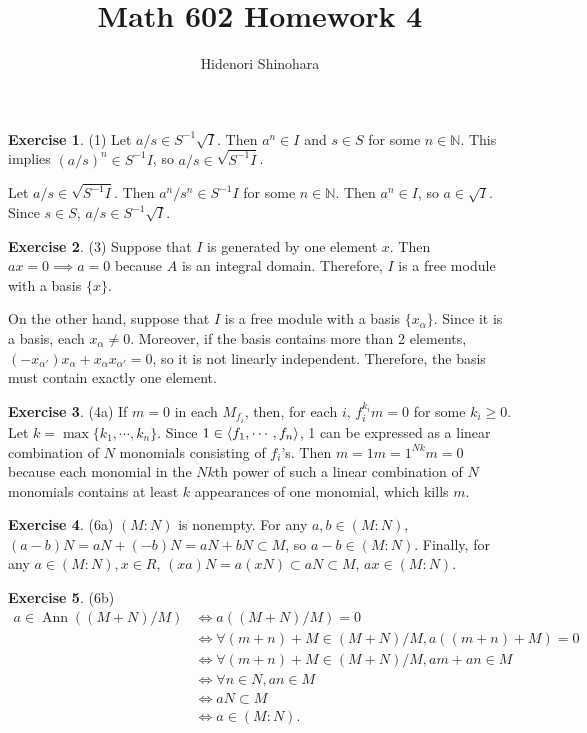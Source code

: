 \documentclass[12pt, psamsfonts]{amsart}
\theoremstyle{definition}
\newtheorem*{exer}{Exercise}
\theoremstyle{remark}
\DeclareMathOperator{\Ann}{Ann}
\numberwithin{equation}{section}
\begin{document}
\title{Math 602 Homework 4}
\author{Hidenori Shinohara}
\maketitle

\begin{exer}{(1)}
  Let $a / s \in S^{-1}\sqrt{I}$.
  Then $a^n \in I$ and $s \in S$ for some $n \in \mathbb{N}$.
  This implies $(a / s)^n \in S^{-1}I$, so $a / s \in \sqrt{S^{-1}I}$.

  Let $a / s \in \sqrt{S^{-1}I}$.
  Then $a^n / s^n \in S^{-1}I$ for some $n \in \mathbb{N}$.
  Then $a^n \in I$, so $a \in \sqrt{I}$.
  Since $s \in S$, $a / s \in S^{-1}\sqrt{I}$.
\end{exer}

\begin{exer}{(3)}
  Suppose that $I$ is generated by one element $x$.
  Then $ax = 0 \implies a = 0$ because $A$ is an integral domain.
  Therefore, $I$ is a free module with a basis $\{ x \}$.
  
  On the other hand, suppose that $I$ is a free module with a basis $\{ x_{\alpha} \}$.
  Since it is a basis, each $x_{\alpha} \ne 0$.
  Moreover, if the basis contains more than 2 elements, $(-x_{\alpha'})x_{\alpha} + x_{\alpha}x_{\alpha'} = 0$, so it is not linearly independent.
  Therefore, the basis must contain exactly one element.
\end{exer}

\begin{exer}{(4a)}
  If $m = 0$ in each $M_{f_i}$, then, for each $i$, $f_i^{k_i}m = 0$ for some $k_i \geq 0$.
  Let $k = \max\{ k_1, \cdots, k_n \}$.
  Since $1 \in \ev{f_1, \cdots, f_n}$, 1 can be expressed as a linear combination of $N$ monomials consisting of $f_i$'s.
  Then $m = 1m = 1^{Nk}m = 0$ because each monomial in the $Nk$th power of such a linear combination of $N$ monomials contains at least $k$ appearances of one monomial, which kills $m$.
\end{exer}

\begin{exer}{(6a)}
  $(M:N)$ is nonempty.
  For any $a, b \in (M:N)$, $(a - b)N = aN + (-b)N = aN + bN \subset M$, so $a - b \in (M:N)$.
  Finally, for any $a \in (M:N), x \in R$, $(xa)N = a(xN) \subset aN \subset M$, $ax \in (M:N)$.
\end{exer}

\begin{exer}{(6b)}
  $ $
  \begin{align*}
    a \in \Ann((M + N) / M)
      &\iff a((M + N) / M) = 0 \\
      &\iff \forall (m + n) + M \in (M + N) / M, a((m + n) + M) = 0 \\
      &\iff \forall (m + n) + M \in (M + N) / M, am + an \in M \\
      &\iff \forall n \in N, an \in M \\
      &\iff aN \subset M \\
      &\iff a \in (M:N).
  \end{align*}
\end{exer}
\end{document}
